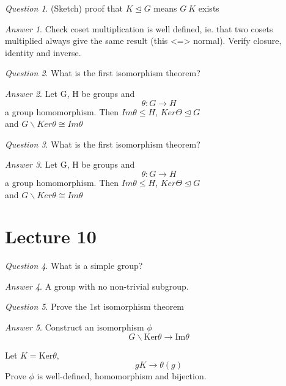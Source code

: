\documentclass[]{article}
\theoremstyle{remark}
\theoremstyle{qnstyle}
\newtheorem{question}{Question}
\theoremstyle{answerstyle}
\newtheorem*{answer}{Answer}
\begin{document}
{
    \begin{question}
        (Sketch) proof that $K \trianglelefteq G$ means $G \ K$ exists
    \end{question}
    \begin{answer}
        Check coset multiplication is well defined, ie. that two cosets multiplied always give
        the same result (this <=> normal). Verify closure, identity and inverse.
    \end{answer}
}

{
    \begin{question}
        What is the first isomorphism theorem?
    \end{question}
    \begin{answer}
        Let G, H be groups and $$\theta: G \to H$$ a group homomorphism.
        Then $Im \theta \leq H$, $Ker \Theta \trianglelefteq G$ \\
        and $G \backslash Ker \theta \cong Im \theta$
    \end{answer}
}

{
    \begin{question}
        What is the first isomorphism theorem?
    \end{question}
    \begin{answer}
        Let G, H be groups and $$\theta: G \to H$$ a group homomorphism.
        Then $Im \theta \leq H$, $Ker \Theta \trianglelefteq G$ \\
        and $G \backslash Ker \theta \cong Im \theta$
    \end{answer}
}

\section*{Lecture 10}
{
    \begin{question}
        What is a simple group?
    \end{question}
    \begin{answer}
        A group with no non-trivial subgroup.
    \end{answer}
}
{
    \begin{question}
        Prove the 1st isomorphism theorem
    \end{question}
    \begin{answer}
        Construct an isomorphism $\phi$
        $$G \backslash \text{Ker}\theta \to \text{Im} \theta$$
    
        Let $K = \text{Ker}\theta,$ $$gK \to \theta(g)$$
        Prove $\phi$ is well-defined, homomorphism and bijection.
    \end{answer}
}
\end{document}

